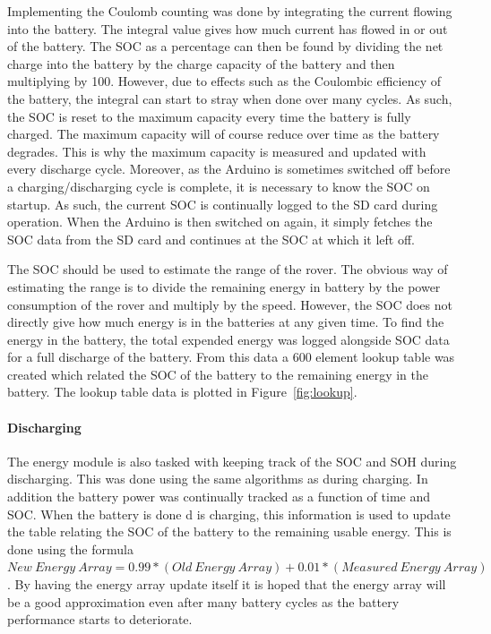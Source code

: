 \documentclass[a4paper]{article}
\begin{document}
Implementing the Coulomb counting was done by integrating the current 
flowing into the battery. The integral value gives how much current 
has flowed in or out of the battery. The SOC as a percentage can 
then be found by dividing the net charge into the battery by the charge 
capacity of the battery and then multiplying by 100. However, due to
effects such as the Coulombic efficiency of the battery, the 
integral can start to stray when done over many cycles. As such, 
the SOC is reset to the maximum capacity every time the battery is 
fully charged. The maximum capacity will of course reduce over 
time as the battery degrades. This is why the maximum capacity is 
measured and updated with every discharge cycle. Moreover, as the 
Arduino is sometimes switched off before a charging/discharging 
cycle is complete, it is necessary to know the SOC on startup. 
As such, the current SOC is continually logged to the SD card during 
operation. When the Arduino is then switched on again, it simply 
fetches the SOC data from the SD card and continues at the SOC at 
which it left off. 

The SOC should be used to estimate the range of the rover. The 
obvious way of estimating the range is to divide the remaining energy 
in battery by the power consumption of the rover and multiply by 
the speed. However, the SOC does not directly give how much energy 
is in the batteries at any given time. To find the energy in the 
battery, the total expended energy was logged alongside SOC data 
for a full discharge of the battery. From this data a 600 element 
lookup table was created which related the SOC of the battery to 
the remaining energy in the battery. The lookup table data is plotted 
in Figure~\ref{fig:lookup}.

\paragraph*{Discharging}
\vspace{-6pt}
The energy module is also tasked with keeping track of the SOC and SOH 
during discharging. This was done using the same algorithms as 
during charging. In addition the battery power was continually 
tracked as a function of time and SOC. When the battery is done d
is charging, this information is used to update the table relating the 
SOC of the battery to the remaining usable energy. This is done using 
the formula 
\( New~Energy~Array = 0.99*(Old~Energy~Array) + 0.01*(Measured~Energy~Array) \). 
By having the energy array update itself it is hoped that the energy 
array will be a good approximation even after many battery cycles 
as the battery performance starts to deteriorate.
\end{document}
